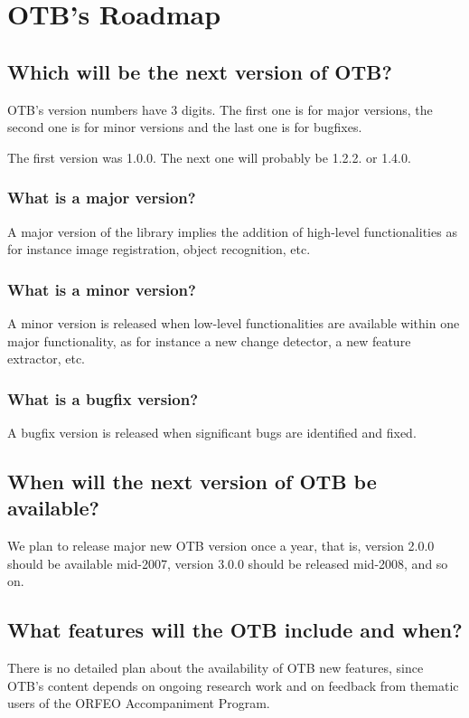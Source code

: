 \section{OTB's Roadmap}
\subsection{Which will be the next version of OTB?}
OTB's version numbers have 3 digits. The first one is for major
versions, the second one is for minor versions and the last one is for
bugfixes.

The first version was 1.0.0. The next one will probably be 1.2.2. or 1.4.0.

\subsubsection{What is a major version?}
A major version of the library implies the addition of high-level
functionalities as for instance image registration, object recognition, etc.

\subsubsection{What is a minor version?}
A minor version is released when low-level functionalities are
available within one major functionality, as for instance a new
change detector, a new feature extractor, etc.

\subsubsection{What is a bugfix version?}
A bugfix version is released when significant bugs are identified and fixed.

\subsection{When will the next version of OTB be available?}
We plan to release major new OTB version once a year, that is, version
2.0.0 should be available mid-2007, version 3.0.0 should be released
mid-2008, and so on.

\subsection{What features will the OTB include and when?}
There is no detailed plan about the availability of OTB new features,
since OTB's content depends on ongoing research work and on feedback
from thematic users of the ORFEO Accompaniment Program.

